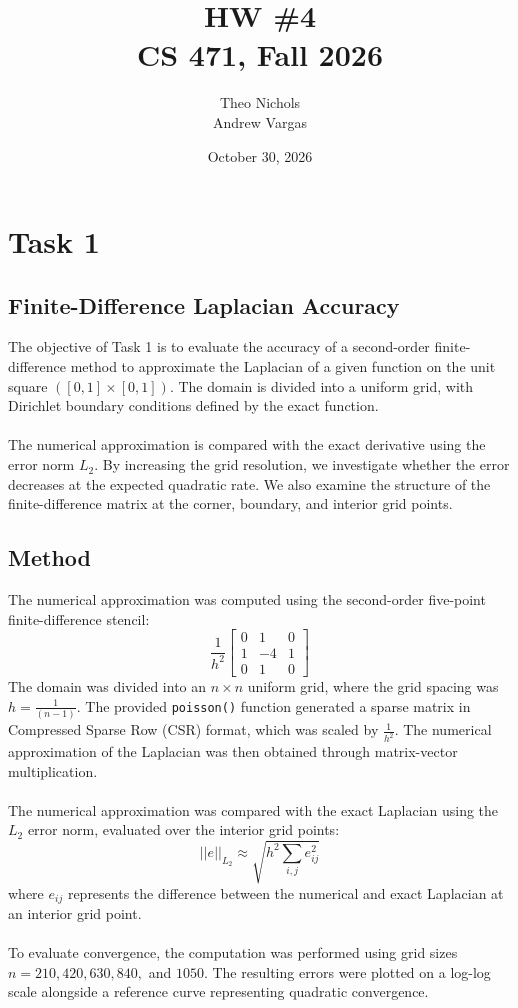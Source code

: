 \documentclass[12pt]{article}
\title{ HW \#4 \\ CS 471, Fall 2026}
\author{Theo Nichols \\Andrew Vargas}
\date{October 30, 2026}   %
\begin{document}
\maketitle
\clearpage

\section{Task 1}

\subsection{Finite-Difference Laplacian Accuracy}
The objective of Task 1 is to evaluate the accuracy of a second-order finite-difference method to approximate the Laplacian of a given function on the unit square $([0,1]\times[0,1])$. The domain is divided into a uniform grid, with Dirichlet boundary conditions defined by the exact function. \\\\
The numerical approximation is compared with the exact derivative using the error norm $L_2$. By increasing the grid resolution, we investigate whether the error decreases at the expected quadratic rate. We also examine the structure of the finite-difference matrix at the corner, boundary, and interior grid points. 

\subsection{Method}
The numerical approximation was computed using the second-order five-point finite-difference stencil: \[ \frac{1}{h^2} \begin{bmatrix}
    0 & 1 & 0 \\ 1 & -4 & 1 \\ 0 & 1 & 0
\end{bmatrix} 
\]
The domain was divided into an $n \times n$ uniform grid, where the grid spacing was $h = \frac{1}{(n-1)}$. The provided \texttt{poisson()} function generated a sparse matrix in Compressed Sparse Row (CSR) format, which was scaled by $\frac{1}{h^2}$. The numerical approximation of the Laplacian was then obtained through matrix-vector multiplication. \\\\
The numerical approximation was compared with the exact Laplacian using the $L_2$ error norm, evaluated over the interior grid points: \begin{equation}
    ||e||_{L_2} \approx \sqrt{h^2 \sum_{i,j} e^2_{ij}}
\end{equation}
where $e_{ij}$ represents the difference between the numerical and exact Laplacian at an interior grid point. \\\\
To evaluate convergence, the computation was performed using grid sizes $n = 210, 420, 630, 840,$ and $1050$. The resulting errors were plotted on a log-log scale alongside a reference curve representing quadratic convergence. 
\end{document}
